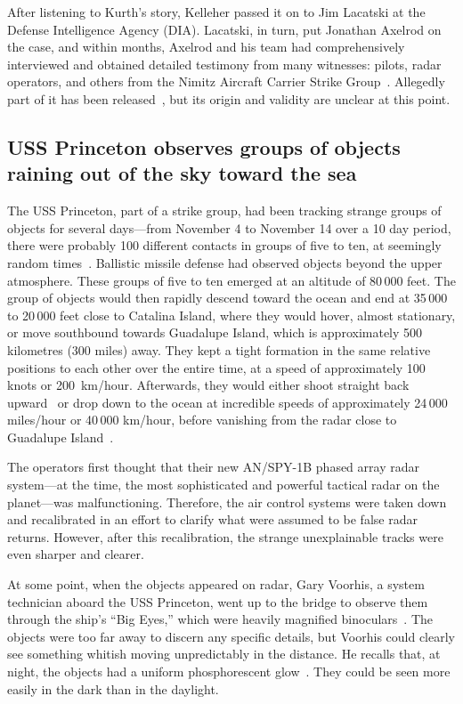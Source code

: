 After listening to Kurth's story, Kelleher passed it on to Jim Lacatski at the Defense Intelligence Agency (DIA). Lacatski, in turn, put Jonathan Axelrod on the case, and within months, Axelrod and his team had comprehensively interviewed and obtained detailed testimony from many witnesses: pilots, radar operators, and others from the Nimitz Aircraft Carrier Strike Group~\cite[p. 41]{Lacatski-2021}.
Allegedly part of it has been released~\cite{ExexSummaryNimitz2019Jun}, but its origin and validity are unclear at this point.

\subsection{USS Princeton observes groups of objects raining out of the sky toward the sea}

The USS Princeton, part of a strike group,
had been tracking strange groups of objects for several days---from November 4 to November 14 over a 10 day period,
there were probably 100 different contacts in groups of five to ten, at seemingly random times~\cite{WestDayKevin2021Feb}.
Ballistic missile defense had observed objects beyond the upper atmosphere.
These groups of five to ten   emerged    at an altitude of 80\,000 feet.
The group of objects would then rapidly descend toward the ocean and end at 35\,000 to 20\,000 feet close to Catalina Island,
where they would hover, almost stationary, or move southbound towards Guadalupe Island, which is approximately 500 kilometres (300 miles) away.
They kept a tight formation in the same relative positions to each other over the entire time,
at a speed of approximately 100 knots or 200~km/hour.
Afterwards, they would either shoot straight back upward~\cite{Cooper2017Dec} or drop down to the ocean
at incredible speeds of approximately 24\,000 miles/hour or 40\,000 km/hour,
before vanishing from the radar close to Guadalupe Island~\cite{WestDayKevin2021Feb}.


The operators first thought that their new AN/SPY-1B phased array radar
system---at the time, the most sophisticated and powerful tactical radar on the planet---was malfunctioning.
Therefore, the air control systems were taken down and recalibrated in an effort to clarify what were assumed
to be false radar returns. However, after this recalibration, the strange unexplainable tracks were even sharper and clearer.

At some point, when the objects appeared on radar,
Gary Voorhis, a system technician aboard the USS Princeton,
went up to the bridge to observe them through the ship's ``Big Eyes,''
which were heavily magnified binoculars~\cite{PMWitnesses2021Mar}.
The objects were too far away to discern any specific details, but Voorhis could clearly see something whitish moving unpredictably in the distance. He
recalls that, at night, the objects had a uniform phosphorescent glow~\cite{WestVoorhis2020Jan}.
They could be seen more easily in the dark than in the daylight.

